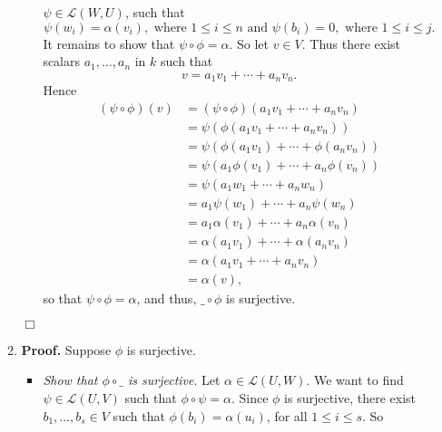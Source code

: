 \documentclass[9pt]{article}
\newcommand{\qed}{\hfill \ensuremath{\Box}}
\begin{document}
\begin{enumerate}
\begin{enumerate}
\begin{itemize}
                        $\psi \in \mathcal{L}(W, U)$, such that
                        $$\psi(w_i) = \alpha(v_i), \text{ where } 1 \le i \le n
                          \text{ and } \psi(b_i) = 0, \text{ where }
                          1 \le i \le j.$$
                        It remains to show that $\psi\circ\phi = \alpha$. So let
                        $v \in  V$. Thus there exist scalars $a_1, \ldots, a_n$
                        in $k$ such that
                        $$v = a_1v_1 + \cdots + a_nv_n.$$
                        Hence
                        \begin{align*}
                           (\psi\circ\phi)(v) &= 
                              (\psi\circ\phi)(a_1v_1 + \cdots + a_nv_n) \\
                              &= \psi(\phi(a_1v_1 + \cdots + a_nv_n)) \\
                              &= \psi(\phi(a_1v_1) + \cdots + \phi(a_nv_n)) \\
                              &= \psi(a_1\phi(v_1) + \cdots + a_n\phi(v_n)) \\
                              &= \psi(a_1w_1 + \cdots + a_nw_n) \\
                              &= a_1\psi(w_1) + \cdots + a_n\psi(w_n) \\
                              &= a_1\alpha(v_1) + \cdots + a_n\alpha(v_n) \\
                              &= \alpha(a_1v_1) + \cdots + \alpha(a_nv_n) \\
                              &= \alpha(a_1v_1 + \cdots + a_nv_n) \\
                              &= \alpha(v),
                        \end{align*}
                        so that $\psi\circ\phi = \alpha$, and thus,
                        $\_\circ\phi$ is surjective.
               \end{itemize} \qed
         \item \textbf{Proof.} Suppose $\phi$ is surjective.
               \begin{itemize}
                  \item \textit{Show that $\phi\circ\_$ is surjective}. Let
                        $\alpha \in \mathcal{L}(U, W)$. We want to find
                        $\psi \in \mathcal{L}(U, V)$ such that
                        $\phi\circ\psi = \alpha$. Since $\phi$ is surjective,
                        there exist $b_1, \ldots, b_s \in V$ such that
                        $\phi(b_i) = \alpha(u_i)$, for all $1 \le i \le s$. So

\end{itemize}
\end{enumerate}
\end{enumerate}
\end{document}
